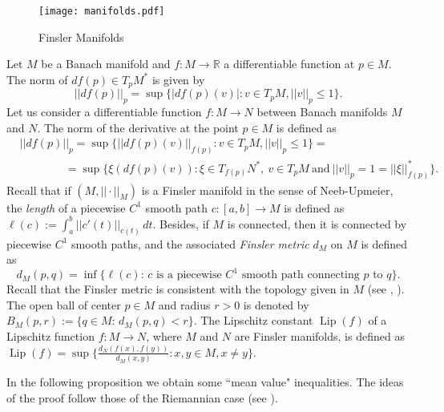\documentclass[11pt]{amsart}
\numberwithin{equation}{section}
\begin{document}
\begin{center}
\begin{figure}[h]
{\texttt{[image: manifolds.pdf]}}
\label{cusp}
\caption{{\small Finsler Manifolds}}
\label{figura}
\end{figure}
\end{center}

Let $M$ be a Banach manifold and $f:M\to{\mathbb{R}}$ a differentiable function at $p\in M$. The norm of $df(p)\in {T_p M}^*$ is given by
\begin{equation*}
||df(p)||_p= \sup\{|df(p)(v)|:v\in T_p M, ||v||_p\le 1\}.
\end{equation*}
Let us consider a differentiable function  $f:M\to N$  between Banach manifolds $M$ and $N$. The norm of the derivative at the point $p\in M$ is defined as
\begin{align*}
& ||df(p)||_p= \sup\{||df(p)(v)||_{f(p)}:v\in T_p M, ||v||_p\le 1\} = &\\
& \qquad \qquad =\sup\{\xi(df(p)(v)):\xi\in {T_{f(p)} N}^*,\ v\in T_pM\ \text{and}\ ||v||_{p}=1=||\xi||^*_{f(p)} \}.&
\end{align*}
Recall that if $(M, ||\cdot||_M)$ is a Finsler manifold in the sense of Neeb-Upmeier, the {\em length} of a piecewise $C^1$ smooth
path $c:[a,b]\rightarrow M$ is defined as $\ell(c):=\int_{a}^b||c'(t)||_{c(t)}\,dt$. Besides, if $M$ is connected, then it is
connected by piecewise $C^1$ smooth paths, and the associated
{\em Finsler metric} $d_M$ on $M$ is defined as
\begin{equation*}
d_M(p,q)=\inf\{\ell(c): \, c \text{ is a piecewise } C^1 \text{ smooth path connecting } p \text{ to } q\}.
\end{equation*}
Recall that the Finsler metric is consistent with the topology given in $M$ (see \cite{Palais}, \cite[Proposition 12.22]{Upmeier}). The open ball of center $p\in M$ and radius
$r>0$ is  denoted by $B_M(p,r):=\{q\in M:\, d_M(p,q)<r\}$. The Lipschitz constant ${\operatorname{Lip}}(f)$ of a Lipschitz function $f:M\rightarrow N$, where
$M$ and $N$ are Finsler manifolds, is defined as ${\operatorname{Lip}}(f)=\sup\{\frac{d_N(f(x),f(y))}{d_M(x,y)}: x,y \in M, x\not=y\}$.

In the following proposition we obtain some  ``mean value" inequalities. The ideas of the proof  follow those of the Riemannian case (see \cite{AzFeMe}).
\end{document}
